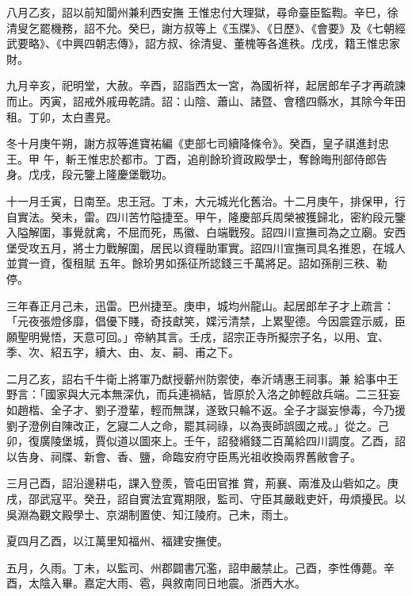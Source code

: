 \begin{pinyinscope}
 八月乙亥，詔以前知閬州兼利西安撫
 王惟忠付大理獄，尋命臺臣監鞫。辛巳，徐清叟乞罷機務，詔不允。癸巳，謝方叔等上《玉牒》、《日歷》、《會要》及《七朝經武要略》、《中興四朝志傳》，詔方叔、徐清叟、董槐等各進秩。戊戌，籍王惟忠家財。



 九月辛亥，祀明堂，大赦。辛酉，詔詣西太一宮，為國祈祥，起居郎牟子才再疏諫而止。丙寅，詔戒外戚毋乾請。詔：山陰、蕭山、諸暨、會稽四縣水，其除今年田租。丁卯，太白晝見。



 冬十月庚午朔，謝方叔等進寶祐編《吏部七司續降條令》。癸酉，皇子祺進封忠王。甲
 午，斬王惟忠於都市。丁酉，追削餘玠資政殿學士，奪餘晦刑部侍郎告身。戊戌，段元鑒上隆慶堡戰功。



 十一月壬寅，日南至。忠王冠。丁未，大元城光化舊治。十二月庚午，排保甲，行自實法。癸未，雷。四川苦竹隘捷至。甲午，隆慶部兵周榮被獲歸北，密約段元鑒入隘解圍，事覺就禽，不屈而死，馬徽、白端戰歿。詔四川宣撫司為之立廟。安西堡受攻五月，將士力戰解圍，居民以資糧助軍實。詔四川宣撫司具名推恩，在城人並賞一資，復租賦
 五年。餘玠男如孫征所認錢三千萬將足。詔如孫削三秩、勒停。



 三年春正月己未，迅雷。巴州捷至。庚申，城均州龍山。起居郎牟子才上疏言：「元夜張燈侈靡，倡優下賤，奇技獻笑，媟污清禁，上累聖德。今因震霆示威，臣願聖明覺悟，天意可回。」帝納其言。壬戌，詔宗正寺所擬宗子名，以用、宜、季、次、紹五字，續大、由、友、嗣、甫之下。



 二月乙亥，詔右千牛衛上將軍乃猷授蘄州防禦使，奉沂靖惠王祠事。兼
 給事中王野言：「國家與大元本無深仇，而兵連禍結，皆原於入洛之帥輕啟兵端。二三狂妄如趙楷、全子才、劉子澄輩，輕而無謀，遂致只輪不返。全子才誕妄慘毒，今乃援劉子澄例自陳改正，乞寢二人之命，罷其祠祿，以為喪師誤國之戒。」從之。己卯，復廣陵堡城，賈似道以圖來上。壬午，詔發緡錢二百萬給四川調度。乙酉，詔以告身、祠牒、新會、香、鹽，命臨安府守臣馬光祖收換兩界舊敝會子。



 三月己酉，詔沿邊耕屯，課入登羨，管屯田官推
 賞，荊襄、兩淮及山砦如之。庚戌，邵武寇平。癸丑，詔自實法宜寬期限，監司、守臣其嚴戢吏奸，毋煩擾民。以吳淵為觀文殿學士、京湖制置使、知江陵府。己未，雨土。



 夏四月乙酉，以江萬里知福州、福建安撫使。



 五月，久雨。丁未，以監司、州郡闢書冗濫，詔申嚴禁止。己酉，李性傳薨。辛酉，太陰入畢。嘉定大雨、雹，與敘南同日地震。浙西大水。




\end{pinyinscope}
